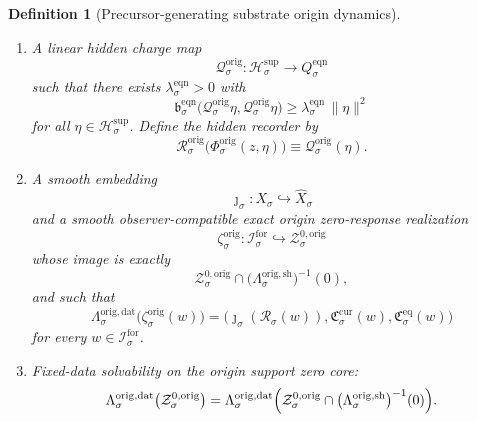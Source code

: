 \documentclass[11pt]{article}
\newcommand{\ForSpace}[1]{\mathcal I_{#1}^{\mathrm{for}}}
\newcommand{\Reduction}[1]{\mathcal R_{#1}}
\newcommand{\CurrentCarrier}[1]{\mathfrak C_{#1}^{\mathrm{cur}}}
\newcommand{\EqCarrier}[1]{\mathfrak C_{#1}^{\mathrm{eq}}}
\newcommand{\VisibleAffine}[1]{\widehat X_{#1}}
\newcommand{\SeedHidden}[1]{\mathcal H_{#1}^{\mathrm{sup}}}
\newcommand{\OrigData}[1]{\Lambda_{#1}^{\mathrm{orig,dat}}}
\newcommand{\OrigShellMap}[1]{\Lambda_{#1}^{\mathrm{orig,sh}}}
\newcommand{\OrigZeroCore}[1]{\mathcal Z_{#1}^{0,\mathrm{orig}}}
\newcommand{\OrigSplit}[1]{\Phi_{#1}^{\mathrm{orig}}}
\newcommand{\OrigCharge}[1]{\mathcal Q_{#1}^{\mathrm{orig}}}
\newcommand{\OrigResidual}[1]{\mathcal R_{#1}^{\mathrm{orig}}}
\newcommand{\OrigEmbed}[1]{\zeta_{#1}^{\mathrm{orig}}}
\newcommand{\EqnTarget}[1]{Q_{#1}^{\mathrm{eqn}}}
\newcommand{\EqnPair}[1]{\mathfrak b_{#1}^{\mathrm{eqn}}}
\newtheorem{definition}{Definition}
\begin{document}
\begin{definition}[Precursor-generating substrate origin dynamics]
\begin{enumerate}
    \item A linear hidden charge map
    \[
    \OrigCharge{\sigma}:\SeedHidden{\sigma}\to\EqnTarget{\sigma}
    \]
    such that there exists \(\lambda_{\sigma}^{\mathrm{eqn}}>0\) with
    \begin{equation}
    \EqnPair{\sigma}\bigl(\OrigCharge{\sigma}\eta,\OrigCharge{\sigma}\eta\bigr)
    \ge
    \lambda_{\sigma}^{\mathrm{eqn}}\,
    \|\eta\|^{2}
    \label{eq:origchargegap}
    \end{equation}
    for all \(\eta\in\SeedHidden{\sigma}\). Define the hidden recorder by
    \begin{equation}
    \OrigResidual{\sigma}\bigl(\OrigSplit{\sigma}(z,\eta)\bigr)
    \equiv
    \OrigCharge{\sigma}(\eta).
    \label{eq:origresidual}
    \end{equation}

    \item A smooth embedding
    \[
    \jmath_{\sigma}:X_{\sigma}\hookrightarrow\VisibleAffine{\sigma}
    \]
    and a smooth observer-compatible exact origin zero-response realization
    \[
    \OrigEmbed{\sigma}:\ForSpace{\sigma}\hookrightarrow\OrigZeroCore{\sigma}
    \]
    whose image is exactly
    \[
    \OrigZeroCore{\sigma}
    \cap
    \bigl(\OrigShellMap{\sigma}\bigr)^{-1}(0),
    \]
    and such that
    \begin{equation}
    \OrigData{\sigma}\bigl(\OrigEmbed{\sigma}(w)\bigr)
    =
    \bigl(
    \jmath_{\sigma}(\Reduction{\sigma}(w)),
    \CurrentCarrier{\sigma}(w),
    \EqCarrier{\sigma}(w)
    \bigr)
    \label{eq:origcompat}
    \end{equation}
    for every \(w\in\ForSpace{\sigma}\).

    \item Fixed-data solvability on the origin support zero core:
    \begin{equation}
    \OrigData{\sigma}\bigl(\OrigZeroCore{\sigma}\bigr)
    =
    \OrigData{\sigma}\Bigl(
    \OrigZeroCore{\sigma}\cap
    \bigl(\OrigShellMap{\sigma}\bigr)^{-1}(0)
    \Bigr).
    \label{eq:origsolvability}
    \end{equation}


\end{enumerate}
\end{definition}
\end{document}
